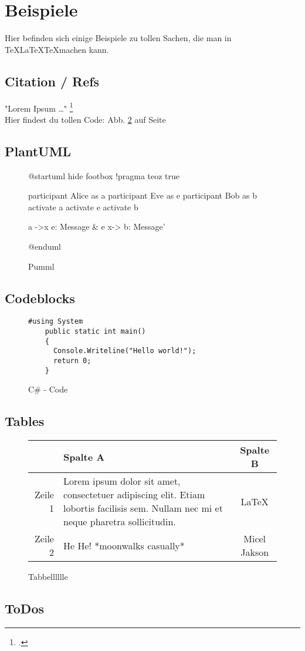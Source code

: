 \section{Beispiele}
Hier befinden sich einige Beispiele zu tollen Sachen, die man in \TeX\LaTeX\TeX machen kann.

\subsection{Citation / Refs}
"Lorem Ipsum \ldots" \footcite[vgl.][S. 420]{Test} \\
Hier findest du tollen Code: Abb. \ref{CSharp} auf Seite \pageref{CSharp}

\subsection{PlantUML}
\begin{figure}[h]
  \centering
  \begin{plantuml}
    @startuml
    hide footbox
    !pragma teoz true

    participant Alice as a
    participant  Eve  as e
    participant  Bob  as b
    activate a
    activate e
    activate b

      a ->x e: Message
    & e x-> b: Message'

    @enduml
  \end{plantuml}
  \caption{Pumml}
  \label{puml}
\end{figure}

\subsection{Codeblocks}
\begin{figure}[h]
  \begin{lstlisting}[language={[Sharp]C}]
    #using System
    public static int main()
    {
      Console.Writeline("Hello world!");
      return 0;
    }
  \end{lstlisting}
  \caption{C\# - Code}
  \label{CSharp}
\end{figure}

\subsection{Tables}
\begin{figure}[h]
  \begin{tabularx}{\textwidth}{|r||X|c|}
    \hline & Spalte A & Spalte B \\
    \hline
    \hline Zeile 1 &
    Lorem ipsum dolor sit amet,
    consectetuer adipiscing elit.
    Etiam lobortis facilisis sem.
    Nullam nec mi et neque pharetra sollicitudin.
    & \LaTeX \\
    \hline Zeile 2 & He He! *moonwalks casually* & Micel Jakson \\
    \hline
  \end{tabularx}
  \caption{Tabbelllllle}
  \label{tab:tab}
\end{figure}

\newpage
\subsection{ToDos}
\listoftodos
